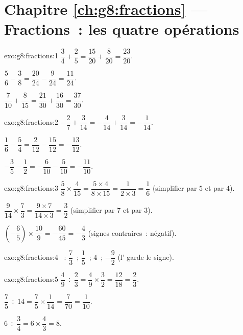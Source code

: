 \section*{Chapitre \ref{ch:g8:fractions} --- Fractions~: les quatre opérations}

\begin{solution}{exo:g8:fractions:1}
$\dfrac34 + \dfrac25 = \dfrac{15}{20} + \dfrac{8}{20} =
\dfrac{23}{20}$.

$\dfrac56 - \dfrac38 = \dfrac{20}{24} - \dfrac{9}{24} =
\dfrac{11}{24}$.

$\dfrac{7}{10} + \dfrac{8}{15} = \dfrac{21}{30} + \dfrac{16}{30} =
\dfrac{37}{30}$.
\end{solution}

\begin{solution}{exo:g8:fractions:2}
$-\dfrac27 + \dfrac{3}{14} = -\dfrac{4}{14} + \dfrac{3}{14} =
-\dfrac{1}{14}$.

$\dfrac16 - \dfrac54 = \dfrac{2}{12} - \dfrac{15}{12} =
-\dfrac{13}{12}$.

$-\dfrac35 - \dfrac12 = -\dfrac{6}{10} - \dfrac{5}{10} =
-\dfrac{11}{10}$.
\end{solution}

\begin{solution}{exo:g8:fractions:3}
$\dfrac58 \times \dfrac{4}{15} = \dfrac{5 \times 4}{8 \times 15}
= \dfrac{1}{2 \times 3} = \dfrac16$ (simplifier par $5$ et par $4$).

$\dfrac{9}{14} \times \dfrac73 = \dfrac{9 \times 7}{14 \times 3}
= \dfrac{3}{2}$ (simplifier par $7$ et par $3$).

$\left(-\dfrac65\right) \times \dfrac{10}{9} = -\dfrac{60}{45}
= -\dfrac43$ (signes contraires~: négatif).
\end{solution}

\begin{solution}{exo:g8:fractions:4}
~: $\dfrac73$~; \quad $\dfrac15$~; \quad $4$~; \quad
$-\dfrac92$ (l' garde le signe).
\end{solution}

\begin{solution}{exo:g8:fractions:5}
$\dfrac49 \div \dfrac23 = \dfrac49 \times \dfrac32 = \dfrac{12}{18}
= \dfrac23$.

$\dfrac75 \div 14 = \dfrac75 \times \dfrac{1}{14} = \dfrac{7}{70}
= \dfrac{1}{10}$.

$6 \div \dfrac34 = 6 \times \dfrac43 = 8$.
\end{solution}

